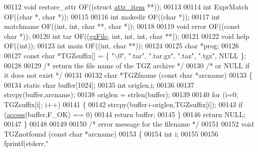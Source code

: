 \begin{DoxyCode}
00112 \textcolor{keywordtype}{void} restore\_attr       OF((\textcolor{keyword}{struct} \hyperlink{structattr__item}{attr\_item} **));
00113 
00114 \textcolor{keywordtype}{int} ExprMatch           OF((\textcolor{keywordtype}{char} *, \textcolor{keywordtype}{char} *));
00115 
00116 \textcolor{keywordtype}{int} makedir             OF((\textcolor{keywordtype}{char} *));
00117 \textcolor{keywordtype}{int} matchname           OF((\textcolor{keywordtype}{int}, \textcolor{keywordtype}{int}, \textcolor{keywordtype}{char} **, \textcolor{keywordtype}{char} *));
00118 
00119 \textcolor{keywordtype}{void} error              OF((\textcolor{keyword}{const} \textcolor{keywordtype}{char} *));
00120 \textcolor{keywordtype}{int} tar                 OF((\hyperlink{structgz_file__s}{gzFile}, \textcolor{keywordtype}{int}, \textcolor{keywordtype}{int}, \textcolor{keywordtype}{int}, \textcolor{keywordtype}{char} **));
00121 
00122 \textcolor{keywordtype}{void} help               OF((\textcolor{keywordtype}{int}));
00123 \textcolor{keywordtype}{int} main                OF((\textcolor{keywordtype}{int}, \textcolor{keywordtype}{char} **));
00124 
00125 \textcolor{keywordtype}{char} *prog;
00126 
00127 \textcolor{keyword}{const} \textcolor{keywordtype}{char} *TGZsuffix[] = \{ \textcolor{stringliteral}{"\(\backslash\)0"}, \textcolor{stringliteral}{".tar"}, \textcolor{stringliteral}{".tar.gz"}, \textcolor{stringliteral}{".taz"}, \textcolor{stringliteral}{".tgz"}, NULL \};
00128 
00129 \textcolor{comment}{/* return the file name of the TGZ archive */}
00130 \textcolor{comment}{/* or NULL if it does not exist */}
00131 
00132 \textcolor{keywordtype}{char} *TGZfname (\textcolor{keyword}{const} \textcolor{keywordtype}{char} *arcname)
00133 \{
00134   \textcolor{keyword}{static} \textcolor{keywordtype}{char} buffer[1024];
00135   \textcolor{keywordtype}{int} origlen,i;
00136 
00137   strcpy(buffer,arcname);
00138   origlen = strlen(buffer);
00139 
00140   \textcolor{keywordflow}{for} (i=0; TGZsuffix[i]; i++)
00141     \{
00142        strcpy(buffer+origlen,TGZsuffix[i]);
00143        \textcolor{keywordflow}{if} (\hyperlink{structaccess}{access}(buffer,F\_OK) == 0)
00144          \textcolor{keywordflow}{return} buffer;
00145     \}
00146   \textcolor{keywordflow}{return} NULL;
00147 \}
00148 
00149 
00150 \textcolor{comment}{/* error message for the filename */}
00151 
00152 \textcolor{keywordtype}{void} TGZnotfound (\textcolor{keyword}{const} \textcolor{keywordtype}{char} *arcname)
00153 \{
00154   \textcolor{keywordtype}{int} i;
00155 
00156   fprintf(stderr,\textcolor{stringliteral}{"%
}
\end{DoxyCode}
